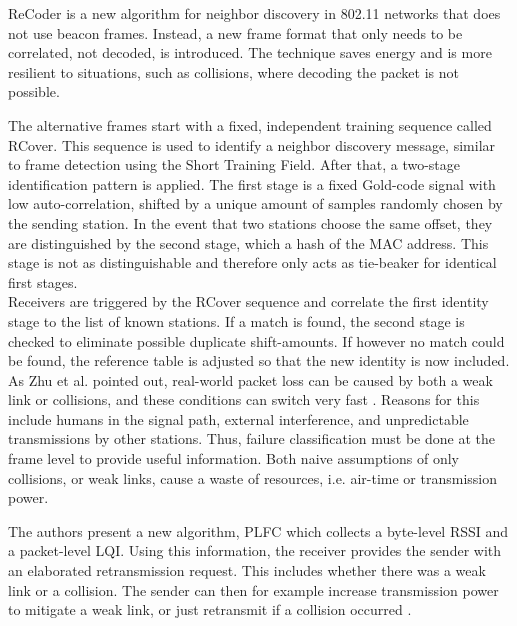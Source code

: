 ReCoder \cite{meng2015} is a new algorithm for neighbor discovery in 802.11 networks that does not use beacon frames. Instead, a new frame format that only needs to be correlated, not decoded, is introduced. The technique saves energy and is more resilient to situations, such as collisions, where decoding the packet is not possible.

The alternative frames start with a fixed, independent training sequence called RCover. This sequence is used to identify a neighbor discovery message, similar to frame detection using the Short Training Field. After that, a two-stage identification pattern is applied. The first stage is a fixed Gold-code signal with low auto-correlation, shifted by a unique amount of samples randomly chosen by the sending station. In the event that two stations choose the same offset, they are distinguished by the second stage, which a hash of the \gls{MAC} address. This stage is not as distinguishable and therefore only acts as tie-beaker for identical first stages.\\

Receivers are triggered by the RCover sequence and correlate the first identity stage to the list of known stations. If a match is found, the second stage is checked to eliminate possible duplicate shift-amounts. If however no match could be found, the reference table is adjusted so that the new identity is now included.\\

As Zhu et al. pointed out, real-world packet loss can be caused by both a weak link or collisions, and these conditions can switch very fast \cite{zhu2015}. Reasons for this include humans in the signal path, external interference, and unpredictable transmissions by other stations. Thus, failure classification must be done at the frame level to provide useful information. Both naive assumptions of only collisions, or weak links, cause a waste of resources, i.e. air-time or transmission power.

The authors present a new algorithm, \gls{PLFC} which collects a byte-level \gls{RSSI} and a packet-level \gls{LQI}. Using this information, the receiver provides the sender with an elaborated retransmission request. This includes whether there was a weak link or a collision. The sender can then for example increase transmission power to mitigate a weak link, or just retransmit if a collision occurred \cite{zhu2016}.\\

